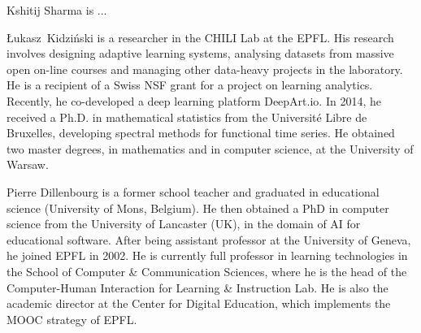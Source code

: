 \documentclass[10pt,journal,compsoc]{IEEEtran}
\begin{document}
\begin{IEEEbiography}{Kshitij Sharma}
 is ...
\end{IEEEbiography}

\begin{IEEEbiography}{{\L}ukasz~Kidzi\'nski}
 is a researcher in the CHILI Lab at the EPFL. His research involves designing adaptive learning systems, analysing datasets from massive open on-line courses and managing other data-heavy projects in the laboratory. He is a recipient of a Swiss NSF grant for a project on learning analytics. Recently, he co-developed a deep learning platform DeepArt.io. In 2014, he received a Ph.D. in mathematical statistics from the Université Libre de Bruxelles, developing spectral methods for functional time series. He obtained two master degrees, in mathematics and in computer science, at the University of Warsaw.
\end{IEEEbiography}


\begin{IEEEbiography}{Pierre Dillenbourg} is a former school teacher and graduated in educational science (University of Mons, Belgium). He then obtained a PhD in computer science from the University of Lancaster (UK), in the domain of AI for educational software. After being assistant professor at the University of Geneva, he joined EPFL in 2002. He is currently full professor in learning technologies in the School of Computer \& Communication Sciences, where he is the head of the Computer-Human Interaction for Learning \& Instruction Lab. He is also the academic director at the Center for Digital Education, which implements the MOOC strategy of EPFL.
\end{IEEEbiography}
\end{document}
